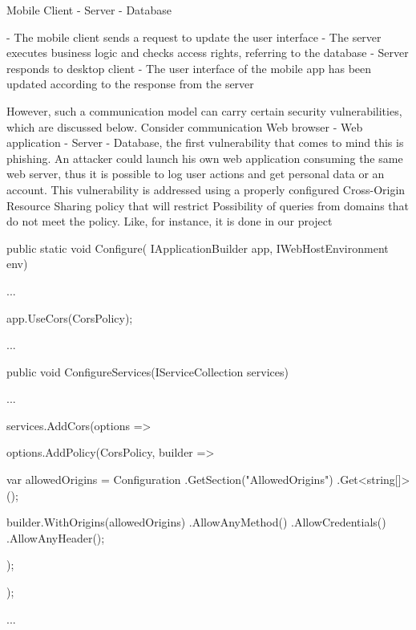 Mobile Client - Server - Database

- The mobile client sends a request to update the user interface
- The server executes business logic and checks access rights, referring to the database
- Server responds to desktop client
- The user interface of the mobile app has been updated according to the response from the server

However, such a communication model can carry certain security vulnerabilities, which are discussed below.
Consider communication Web browser - Web application - Server - Database, the first vulnerability that comes to mind
this is phishing.
An attacker could launch his own web application consuming the same web server, thus
it is possible to log user actions and get personal data or an account.
This vulnerability is addressed using a properly configured Cross-Origin Resource Sharing policy that will restrict
Possibility of queries from domains that do not meet the policy.
Like, for instance, it is done in our project
\begin{spverbatim}
    public static void Configure(
    IApplicationBuilder app,
    IWebHostEnvironment env)
    {
        ...

        app.UseCors(CorsPolicy);

        ...
    }

    public void ConfigureServices(IServiceCollection services)
    {
        ...

        services.AddCors(options =>
        {
            options.AddPolicy(CorsPolicy, builder =>
            {
                var allowedOrigins = Configuration
                        .GetSection("AllowedOrigins")
                        .Get<string[]>();

                builder.WithOrigins(allowedOrigins)
                       .AllowAnyMethod()
                       .AllowCredentials()
                       .AllowAnyHeader();
            });
        });

        ...
    }
\end{spverbatim}

